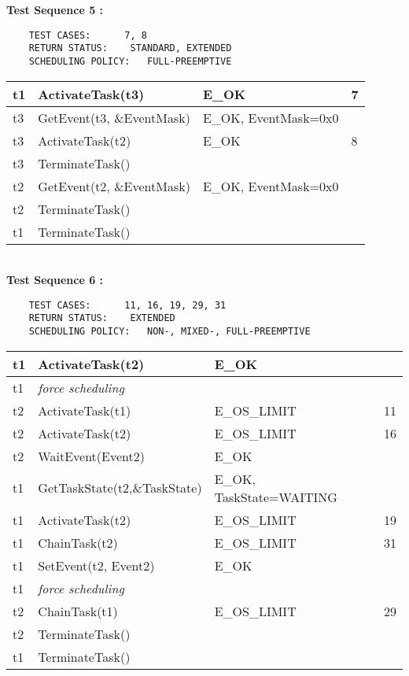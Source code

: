 \documentclass[10pt]{article}
\newlength{\Li}\settowidth{\Li}{Running}
\newlength{\Lii}\setlength{\Lii}{7cm}
\newlength{\Liiii}\setlength{\Liiii}{0.9cm}
\newlength{\Liii}\setlength{\Liii}{\textwidth} \addtolength{\Liii}{-\Li} \addtolength{\Liii}{-\Lii} \addtolength{\Liii}{-\Liiii}
\begin{document}
	\textbf{Test Sequence 5 :}
	\begin{lstlisting}
	TEST CASES:		 7, 8
	RETURN STATUS:	  STANDARD, EXTENDED
	SCHEDULING POLICY:   FULL-PREEMPTIVE
	\end{lstlisting}
	

	\begin{supertabular}{|p{\Li}|p{\Lii}|p{\Liii}|p{\Liiii}|} \hline 
	t1	& ActivateTask(t3) 			& E\_OK 				& 7 \\ \hline 
	t3 	& GetEvent(t3, \&EventMask) 	& E\_OK, EventMask=0x0	& \\ \hline
	t3	& ActivateTask(t2) 			& E\_OK 				& 8 \\ \hline 
	t3	& TerminateTask()  				&					& \\ \hline
	t2 	& GetEvent(t2, \&EventMask) 	& E\_OK, EventMask=0x0	& \\ \hline
	t2	& TerminateTask()  				&					& \\ \hline
	t1	& TerminateTask() 				&					& \\ \hline
	\end{supertabular} \\
	
	\textbf{Test Sequence 6 :}
	\begin{lstlisting}
	TEST CASES:		 11, 16, 19, 29, 31
	RETURN STATUS:	  EXTENDED
	SCHEDULING POLICY:   NON-, MIXED-, FULL-PREEMPTIVE
	\end{lstlisting}
	

	\begin{supertabular}{|p{\Li}|p{\Lii}|p{\Liii}|p{\Liiii}|} \hline 	
	t1 	& ActivateTask(t2) 			& E\_OK					& \\ \hline
	t1 	& \textit{force scheduling}			& 						& \\ \hline
	t2	& ActivateTask(t1) 			& E\_OS\_LIMIT			& 11 \\ \hline
	t2	& ActivateTask(t2) 			& E\_OS\_LIMIT			& 16 \\ \hline
	t2	& WaitEvent(Event2) 			& E\_OK					& \\ \hline
	t1	& GetTaskState(t2,\&TaskState)	& E\_OK, TaskState=WAITING	& \\ \hline
	t1	& ActivateTask(t2) 			& E\_OS\_LIMIT 			& 19 \\ \hline
	t1	& ChainTask(t2)				& E\_OS\_LIMIT 			& 31 \\ \hline
	t1	& SetEvent(t2, Event2)		& E\_OK					& \\ \hline
	t1	& \textit{force scheduling}			& 						&\\ \hline
	t2	& ChainTask(t1) 			& E\_OS\_LIMIT			& 29 \\ \hline
	t2 	& TerminateTask()	 			& 						&\\ \hline
	t1 	& TerminateTask()	 			& 						&\\ \hline
	\end{supertabular} \\
\end{document}
